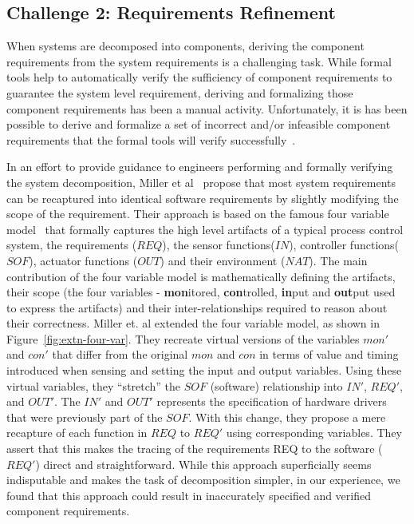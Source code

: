 \subsection{Challenge 2: Requirements Refinement}

When systems are decomposed into components, deriving the component requirements from the system requirements is a challenging task. While formal tools help to automatically verify the sufficiency of component requirements to guarantee the system level requirement, deriving and formalizing those component requirements has been a manual activity. Unfortunately, it is has been possible to derive and formalize a set of incorrect and/or infeasible component requirements that the formal tools will verify successfully~\cite{gacek2015towards}.

In an effort to provide guidance to engineers performing and formally verifying the system decomposition, Miller et al~\cite{Miller01:dasc} propose that most system requirements can be recaptured into identical software requirements by slightly modifying the scope of the requirement. Their approach is based on the famous four variable model~\cite{Parnas91:four-variable} that formally captures the high level artifacts of a typical process control system, the requirements ($REQ$), the sensor functions($IN$), controller functions($SOF$), actuator functions ($OUT$) and their environment ($NAT$). The main contribution of the four variable model is mathematically defining the artifacts, their scope (the four variables - \textbf{mon}itored, \textbf{con}trolled, \textbf{in}put and \textbf{out}put used to express the artifacts) and their inter-relationships required to reason about their correctness. Miller et. al extended the four variable model, as shown in Figure~\ref{fig:extn-four-var}. They recreate virtual versions of the variables $mon'$ and $con'$ that differ from the original $mon$ and $con$ in terms of value and timing introduced when sensing and setting the input and output variables. Using these virtual variables, they ``stretch'' the $SOF$ (software) relationship into $IN'$, $REQ'$, and $OUT'$. The $IN'$ and $OUT'$ represents the specification of hardware drivers that were previously part of the $SOF$. With this change, they propose a mere recapture of each function in $REQ$ to $REQ'$ using corresponding variables. They assert that this makes the tracing of the requirements REQ to the software ($REQ'$) direct and straightforward. While this approach superficially seems indisputable and makes the task of decomposition simpler, in our experience, we found that this approach could result in inaccurately specified and verified component requirements.

